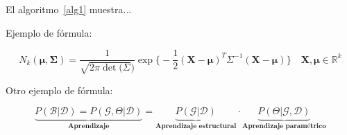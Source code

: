 El algoritmo~\ref{alg1} muestra...
\medskip



\newpage

Ejemplo de fórmula:

\begin{equation*}
    N_{k}(\mathbf{\mu},\mathbf{\Sigma}) = \frac{1}{\sqrt{2\pi\det(\Sigma})} \exp \bigg\{ -\frac{1}{2}(\mathbf{X}-\mathbf{\mu})^{T}\Sigma^{-1}(\mathbf{X}-\mathbf{\mu}) \bigg\} \quad \mathbf{X},\mathbf{\mu} \in \mathbb{R}^{k}
\end{equation*}

Otro ejemplo de fórmula:

\begin{equation*}
    \underbrace{P(\mathcal{B}|\mathcal{D}) = P(\mathcal{\mathcal{G}},\Theta|\mathcal{D})}_{\textbf{Aprendizaje}} = \underbrace{P(\mathcal{G}|\mathcal{D})}_{\textbf{Aprendizaje estructural}} \cdot \underbrace{P(\Theta|\mathcal{G},\mathcal{D})}_{\textbf{Aprendizaje paramétrico}}
\end{equation*}
